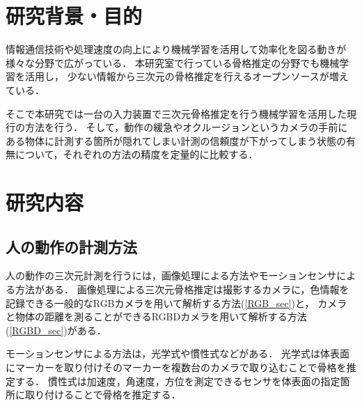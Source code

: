 \documentclass[titlepage]{jarticle}
\begin{document}
\maketitle

\section{研究背景・目的}
情報通信技術や処理速度の向上により機械学習を活用して効率化を図る動きが様々な分野で広がっている．
本研究室で行っている骨格推定の分野でも機械学習を活用し，%
少ない情報から三次元の骨格推定を行えるオープンソースが増えている．



そこで本研究では一台の入力装置で三次元骨格推定を行う機械学習を活用した現行の方法を行う．
そして，動作の緩急やオクルージョンというカメラの手前にある物体に計測する箇所が隠れてしまい計測の信頼度が下がってしまう状態の有無について，それぞれの方法の精度を定量的に比較する．
\section{研究内容}
\subsection{人の動作の計測方法}
%
人の動作の三次元計測を行うには，画像処理による方法やモーションセンサによる方法がある．%
画像処理による三次元骨格推定は撮影するカメラに，色情報を記録できる一般的なRGBカメラを用いて解析する方法(\ref{RGB_sec})と，
カメラと物体の距離を測ることができるRGBDカメラを用いて解析する方法(\ref{RGBD_sec})がある．

モーションセンサによる方法は，光学式や慣性式などがある．
光学式は体表面にマーカーを取り付けそのマーカーを複数台のカメラで取り込むことで骨格を推定する．
慣性式は加速度，角速度，方位を測定できるセンサを体表面の指定箇所に取り付けることで骨格を推定する．
\end{document}
